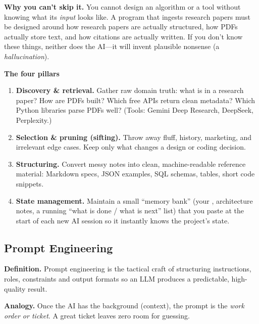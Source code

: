 \documentclass[11pt,a4paper]{article}
\newcommand{\fn}[1]{\texttt{\detokenize{#1}}}
\begin{document}
\textbf{Why you can't skip it.} You cannot design an algorithm or a tool without knowing what its \emph{input} looks like. A program that ingests research papers must be designed around how research papers are actually structured, how PDFs actually store text, and how citations are actually written. If you don't know these things, neither does the AI---it will invent plausible nonsense (a \emph{hallucination}).

\textbf{The four pillars}
\begin{enumerate}
\item \textbf{Discovery \& retrieval.} Gather raw domain truth: what is in a research paper? How are PDFs built? Which free APIs return clean metadata? Which Python libraries parse PDFs well? (Tools: Gemini Deep Research, DeepSeek, Perplexity.)
\item \textbf{Selection \& pruning (sifting).} Throw away fluff, history, marketing, and irrelevant edge cases. Keep only what changes a design or coding decision.
\item \textbf{Structuring.} Convert messy notes into clean, machine-readable reference material: Markdown specs, JSON examples, SQL schemas, tables, short code snippets.
\item \textbf{State management.} Maintain a small ``memory bank'' (your \fn{CONTEXT.md}, architecture notes, a running ``what is done / what is next'' list) that you paste at the start of each new AI session so it instantly knows the project's state.
\end{enumerate}

\subsection{Prompt Engineering}
\begin{tcolorbox}[colback=white,colframe=accent,boxrule=0.6pt,arc=2pt]
\textbf{Definition.} Prompt engineering is the tactical craft of structuring instructions, roles, constraints and output formats so an LLM produces a predictable, high-quality result.
\end{tcolorbox}

\textbf{Analogy.} Once the AI has the background (context), the prompt is the \emph{work order or ticket}. A great ticket leaves zero room for guessing.
\end{document}
